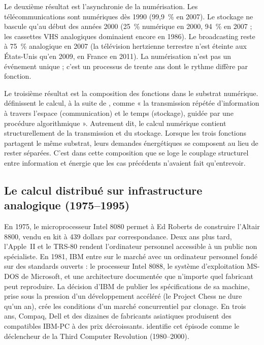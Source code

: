 Le deuxième résultat est l'asynchronie de la numérisation. Les télécommunications sont numériques dès 1990 (99,9~\% en 2007). Le stockage ne bascule qu'au début des années 2000 (25~\% numérique en 2000, 94~\% en 2007 ; les cassettes VHS analogiques dominaient encore en 1986). Le broadcasting reste à 75~\% analogique en 2007 (la télévision hertzienne terrestre n'est éteinte aux États-Unis qu'en 2009, en France en 2011). La numérisation n'est pas un événement unique ; c'est un processus de trente ans dont le rythme diffère par fonction.
 
Le troisième résultat est la composition des fonctions dans le substrat numérique. \textcite{hilbert_worlds_2011} définissent le calcul, à la suite de \textcite{turing_computable_1936}, comme « la transmission répétée d'information à travers l'espace (communication) et le temps (stockage), guidée par une procédure algorithmique ». Autrement dit, le calcul numérique contient structurellement de la transmission et du stockage. Lorsque les trois fonctions partagent le même substrat, leurs demandes énergétiques se composent au lieu de rester séparées. C'est dans cette composition que se loge le couplage structurel entre information et énergie que les cas précédents n'avaient fait qu'entrevoir.
 
 
\subsection{Le calcul distribué sur infrastructure analogique (1975--1995)}\label{subsec:pc}
 
En 1975, le microprocesseur Intel 8080 permet à Ed Roberts de construire l'Altair 8800, vendu en kit à 439 dollars par correspondance. Deux ans plus tard, l'Apple~II et le TRS-80 rendent l'ordinateur personnel accessible à un public non spécialiste. En 1981, IBM entre sur le marché avec un ordinateur personnel fondé sur des standards ouverts : le processeur Intel 8088, le système d'exploitation MS-DOS de Microsoft, et une architecture documentée que n'importe quel fabricant peut reproduire. La décision d'IBM de publier les spécifications de sa machine, prise sous la pression d'un développement accéléré (le Project Chess ne dure qu'un an), crée les conditions d'un marché concurrentiel par clonage. En trois ans, Compaq, Dell et des dizaines de fabricants asiatiques produisent des compatibles IBM-PC à des prix décroissants. \textcite{vanderkooij_information_2023} identifie cet épisode comme le déclencheur de la Third Computer Revolution (1980--2000).

